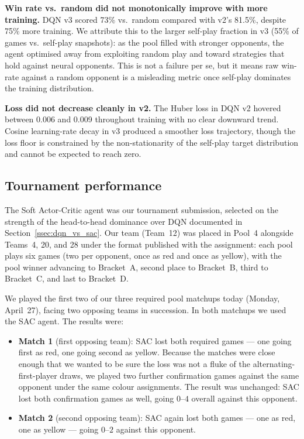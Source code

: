 \documentclass[11pt]{article}
\begin{document}
\textbf{Win rate vs.\ random did not monotonically improve with more
training.} DQN v3 scored 73\% vs.\ random compared with v2's 81.5\%,
despite 75\% more training. We attribute this to the larger self-play
fraction in v3 (55\% of games vs.\ self-play snapshots): as the pool
filled with stronger opponents, the agent optimised away from
exploiting random play and toward strategies that hold against neural
opponents. This is not a failure per se, but it means raw win-rate
against a random opponent is a misleading metric once self-play
dominates the training distribution.

\textbf{Loss did not decrease cleanly in v2.} The Huber loss in DQN v2
hovered between 0.006 and 0.009 throughout training with no clear
downward trend. Cosine learning-rate decay in v3 produced a smoother
loss trajectory, though the loss floor is constrained by the
non-stationarity of the self-play target distribution and cannot be
expected to reach zero.

\subsection{Tournament performance}
\label{ssec:tournament}

The Soft Actor-Critic agent was our tournament submission, selected on
the strength of the head-to-head dominance over DQN documented in
Section~\ref{ssec:dqn_vs_sac}. Our team (Team~12) was placed in
Pool~4 alongside Teams~4, 20, and 28 under the format published with
the assignment: each pool plays six games (two per opponent, once as
red and once as yellow), with the pool winner advancing to Bracket~A,
second place to Bracket~B, third to Bracket~C, and last to
Bracket~D.

We played the first two of our three required pool matchups today
(Monday, April~27), facing two opposing teams in succession. In
both matchups we used the SAC agent. The results were:

\begin{itemize}
    \item \textbf{Match 1} (first opposing team): SAC lost both required games --- one
    going first as red, one going second as yellow. Because the
    matches were close enough that we wanted to be sure the loss was
    not a fluke of the alternating-first-player draws, we played two
    further confirmation games against the same opponent under the
    same colour assignments. The result was unchanged: SAC lost both
    confirmation games as well, going $0$--$4$ overall against this
    opponent.
    \item \textbf{Match 2} (second opposing team): SAC again lost both
    games --- one as red, one as yellow --- going $0$--$2$ against
    this opponent.
\end{itemize}
\end{document}
